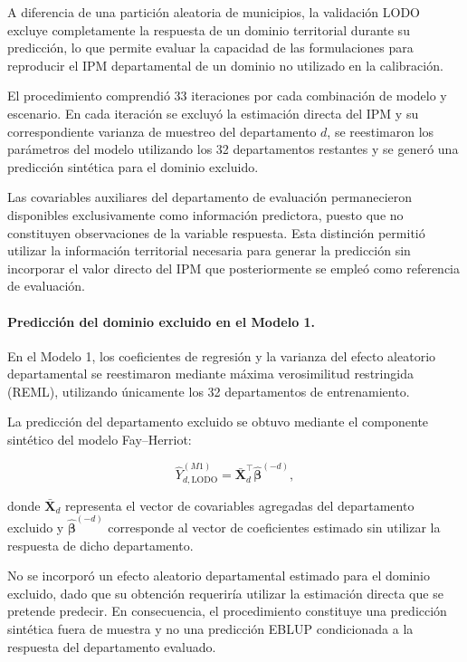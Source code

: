 A diferencia de una partición aleatoria de municipios, la validación LODO excluye completamente la respuesta de un dominio territorial durante su predicción, lo que permite evaluar la capacidad de las formulaciones para reproducir el IPM departamental de un dominio no utilizado en la calibración.

El procedimiento comprendió 33 iteraciones por cada combinación de modelo y escenario. En cada iteración se excluyó la estimación directa del IPM y su correspondiente varianza de muestreo del departamento $d$, se reestimaron los parámetros del modelo utilizando los 32 departamentos restantes y se generó una predicción sintética para el dominio excluido.

Las covariables auxiliares del departamento de evaluación permanecieron disponibles exclusivamente como información predictora, puesto que no constituyen observaciones de la variable respuesta. Esta distinción permitió utilizar la información territorial necesaria para generar la predicción sin incorporar el valor directo del IPM que posteriormente se empleó como referencia de evaluación.

\paragraph{Predicción del dominio excluido en el Modelo 1.}

En el Modelo 1, los coeficientes de regresión y la varianza del efecto aleatorio departamental se reestimaron mediante máxima verosimilitud restringida (REML), utilizando únicamente los 32 departamentos de entrenamiento.

La predicción del departamento excluido se obtuvo mediante el componente sintético del modelo Fay--Herriot:

\begin{equation}
\widehat{Y}_{d,\mathrm{LODO}}^{(M1)}
=
\bar{\mathbf{X}}_d^{\top}
\widehat{\boldsymbol{\beta}}^{(-d)},
\label{eq:lodo-m1}
\end{equation}

donde $\bar{\mathbf{X}}_d$ representa el vector de covariables agregadas del departamento excluido y $\widehat{\boldsymbol{\beta}}^{(-d)}$ corresponde al vector de coeficientes estimado sin utilizar la respuesta de dicho departamento.

No se incorporó un efecto aleatorio departamental estimado para el dominio excluido, dado que su obtención requeriría utilizar la estimación directa que se pretende predecir. En consecuencia, el procedimiento constituye una predicción sintética fuera de muestra y no una predicción EBLUP condicionada a la respuesta del departamento evaluado.

